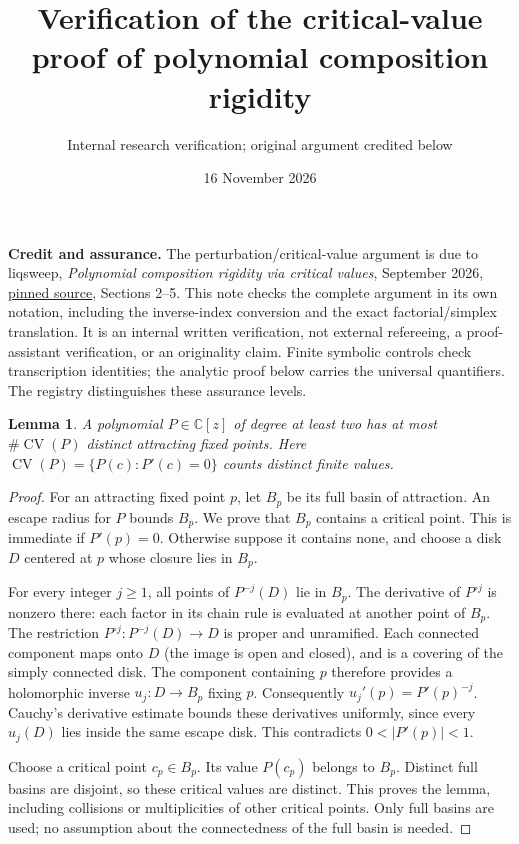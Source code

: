 \documentclass[11pt]{article}
\title{Verification of the critical-value proof of polynomial composition rigidity}
\author{Internal research verification; original argument credited below}
\date{16 November 2026}
\newtheorem{lemma}[theorem]{Lemma}
\DeclareMathOperator{\CV}{CV}
\newcommand{\C}{\mathbb C}
\begin{document}
\maketitle

\noindent\textbf{Credit and assurance.}
The perturbation/critical-value argument is due to liqsweep,
\emph{Polynomial composition rigidity via critical values}, September 2026,
\href{https://github.com/blueberryvertigo/polynomial-composition-rigidity/blob/051c74aad9ef9bf8804c371964803aee099c5b63/rigidity.typ}{pinned source},
Sections 2--5. This note checks the complete argument in its own notation,
including the inverse-index conversion and the exact factorial/simplex
translation. It is an internal written verification, not external refereeing,
a proof-assistant verification, or an originality claim. Finite symbolic
controls check transcription identities; the analytic proof below carries
the universal quantifiers. The registry distinguishes these assurance levels.

\begin{lemma}\label{lem:basins}
A polynomial $P\in\C[z]$ of degree at least two has at most
$\#\CV(P)$ distinct attracting fixed points. Here
$\CV(P)=\{P(c):P'(c)=0\}$ counts distinct finite values.
\end{lemma}
\begin{proof}
For an attracting fixed point $p$, let $B_p$ be its full basin of attraction.
An escape radius for $P$ bounds $B_p$. We prove that $B_p$ contains a critical
point. This is immediate if $P'(p)=0$. Otherwise suppose it contains none,
and choose a disk $D$ centered at $p$ whose closure lies in $B_p$.

For every integer $j\geq1$, all points of $P^{-j}(D)$ lie in $B_p$.
The derivative of $P^{\circ j}$ is nonzero there: each factor in its chain
rule is evaluated at another point of $B_p$. The restriction
$P^{\circ j}:P^{-j}(D)\to D$ is proper and unramified. Each connected
component maps onto $D$ (the image is open and closed), and is a covering
of the simply connected disk. The component containing $p$ therefore
provides a holomorphic inverse $u_j:D\to B_p$ fixing $p$. Consequently
$u_j'(p)=P'(p)^{-j}$. Cauchy's derivative estimate bounds these derivatives
uniformly, since every $u_j(D)$ lies inside the same escape disk. This
contradicts $0<|P'(p)|<1$.

Choose a critical point $c_p\in B_p$. Its value $P(c_p)$ belongs to $B_p$.
Distinct full basins are disjoint, so these critical values are distinct.
This proves the lemma, including collisions or multiplicities of other
critical points. Only full basins are used; no assumption about the
connectedness of the full basin is needed.
\end{proof}
\end{document}

